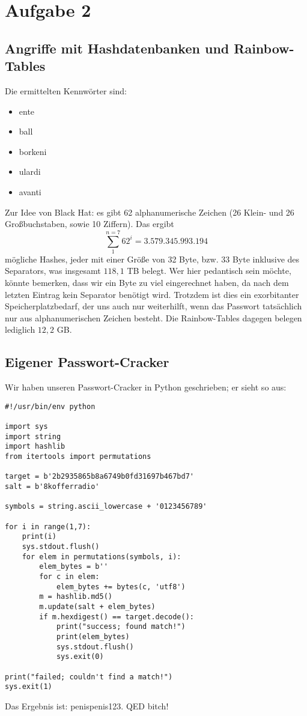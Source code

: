 \documentclass[12pt,a4paper]{article}
\begin{document}
\setcounter{section}{2}
\setcounter{subsection}{0}
\section*{Aufgabe 2}
\subsection{Angriffe mit Hashdatenbanken und Rainbow-Tables}
Die ermittelten Kennwörter sind:
\begin{itemize}
\item ente
\item ball
\item borkeni
\item ulardi
\item avanti
\end{itemize}
Zur Idee von Black Hat:
es gibt 62 alphanumerische Zeichen (26 Klein- und 26 Großbuchstaben, sowie 10 Ziffern).
Das ergibt $$ \sum_1^{n=7} 62^i = 3.579.345.993.194 $$ mögliche Hashes, jeder mit einer
Größe von 32 Byte, bzw. 33 Byte inklusive des Separators, was insgesamt $118,1$ TB belegt.
Wer hier pedantisch sein möchte, könnte bemerken, dass wir ein Byte zu viel eingerechnet
haben, da nach dem letzten Eintrag kein Separator benötigt wird. Trotzdem ist dies ein
exorbitanter Speicherplatzbedarf, der uns auch nur weiterhilft, wenn das Passwort
tatsächlich nur aus alphanumerischen Zeichen besteht. Die Rainbow-Tables dagegen belegen
lediglich $12,2$ GB.

\subsection{Eigener Passwort-Cracker}
Wir haben unseren Passwort-Cracker in Python geschrieben; er sieht so aus:
\begin{verbatim}
#!/usr/bin/env python

import sys
import string
import hashlib
from itertools import permutations

target = b'2b2935865b8a6749b0fd31697b467bd7'
salt = b'8kofferradio'

symbols = string.ascii_lowercase + '0123456789'

for i in range(1,7):
    print(i)
    sys.stdout.flush()
    for elem in permutations(symbols, i):
        elem_bytes = b''
        for c in elem:
            elem_bytes += bytes(c, 'utf8')
        m = hashlib.md5()
        m.update(salt + elem_bytes)
        if m.hexdigest() == target.decode():
            print("success; found match!")
            print(elem_bytes)
            sys.stdout.flush()
            sys.exit(0)

print("failed; couldn't find a match!")
sys.exit(1)
\end{verbatim}
Das Ergebnis ist: penispenis123. QED bitch!
\end{document}
